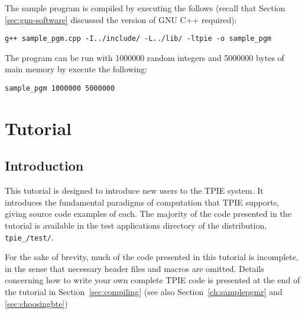 

The sample program is compiled by executing the follows
(recall that Section \ref{sec:gnu-software} discussed the version of GNU C++
required):

\begin{verbatim}
g++ sample_pgm.cpp -I../include/ -L../lib/ -ltpie -o sample_pgm
\end{verbatim}

The program can be run with 1000000 random integers and 5000000 bytes of main
memory by execute the following:
\begin{verbatim}
sample_pgm 1000000 5000000
\end{verbatim}


\chapter{Tutorial}
\label{ch:tutorial}

\section{Introduction}

This tutorial is designed to introduce new users to the TPIE system.
It introduces the fundamental paradigms of computation that TPIE
supports, giving source code examples of each.  The majority of the
code presented in the tutorial is available in the test
applications directory of the distribution, 
{\tt tpie\_\version/test/}.

For the sake of brevity, much of the code presented in this tutorial is
incomplete, in the sense that necessary header files 
and macros are omitted. Details concerning how to write your
own complete TPIE code is presented at the end of the tutorial in
Section~\ref{sec:compiling} (see also Section~\ref{ch:samplepgmr} and
\ref{sec:choosingbte})



